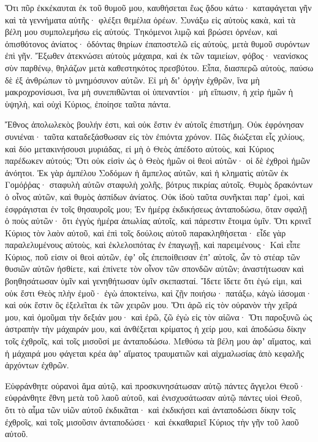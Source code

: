 {Ὅτι πῦρ ἐκκέκαυται ἐκ τοῦ θυμοῦ μου, καυθήσεται ἕως ᾄδου κάτω· καταφάγεται γῆν καὶ τὰ γεννήματα αὐτῆς· φλέξει θεμέλια ὀρέων.
Συνάξω εἰς αὐτοὺς κακὰ, καὶ τὰ βέλη μου συμπολεμήσω εἰς αὐτούς.
Τηκόμενοι λιμῷ καὶ βρώσει ὀρνέων, καὶ ὀπισθότονος ἀνίατος· ὀδόντας θηρίων ἐπαποστελῶ εἰς αὐτοὺς, μετὰ θυμοῦ συρόντων ἐπὶ γῆν.
Ἔξωθεν ἀτεκνώσει αὐτοὺς μάχαιρα, καὶ ἐκ τῶν ταμιείων, φόβος· νεανίσκος σὺν παρθένῳ, θηλάζων μετὰ καθεστηκότος πρεσβύτου.
Εἶπα, διασπερῶ αὐτοὺς, παύσω δὲ ἐξ ἀνθρώπων τὸ μνημόσυνον αὐτῶν.
Εἰ μὴ διʼ ὀργὴν ἐχθρῶν, ἵνα μὴ μακροχρονίσωσι, ἵνα μὴ συνεπιθῶνται οἱ ὑπεναντίοι· μὴ εἴπωσιν, ἡ χεὶρ ἡμῶν ἡ ὑψηλὴ, καὶ οὐχὶ Κύριος, ἐποίησε ταῦτα πάντα.
\par }{\PP {}Ἔθνος ἀπολωλεκὸς βουλήν ἐστι, καὶ οὐκ ἔστιν ἐν αὐτοῖς ἐπιστήμη.
Οὐκ ἐφρόνησαν συνιέναι· ταῦτα καταδεξάσθωσαν εἰς τὸν ἐπιόντα χρόνον.
Πῶς διώξεται εἷς χιλίους, καὶ δύο μετακινήσουσι μυριάδας, εἰ μὴ ὁ Θεὸς ἀπέδοτο αὐτοὺς, καὶ Κύριος παρέδωκεν αὐτούς;
Ὅτι οὐκ εἰσὶν ὡς ὁ Θεὸς ἡμῶν οἱ θεοὶ αὐτῶν· οἱ δὲ ἐχθροὶ ἡμῶν ἀνόητοι.
Ἐκ γὰρ ἀμπέλου Σοδόμων ἡ ἄμπελος αὐτῶν, καὶ ἡ κληματὶς αὐτῶν ἐκ Γομόῤῥας· σταφυλὴ αὐτῶν σταφυλὴ χολῆς, βότρυς πικρίας αὐτοῖς.
Θυμὸς δρακόντων ὁ οἶνος αὐτῶν, καὶ θυμὸς ἀσπίδων ἀνίατος.
Οὐκ ἰδοὺ ταῦτα συνῆκται παρʼ ἐμοὶ, καὶ ἐσφράγισται ἐν τοῖς θησαυροῖς μου;
Ἐν ἡμέρᾳ ἐκδικήσεως ἀνταποδώσω, ὅταν σφαλῇ ὁ ποὺς αὐτῶν· ὅτι ἐγγὺς ἡμέρα ἀπωλίας αὐτοῖς, καὶ πάρεστιν ἕτοιμα ὑμῖν.
Ὅτι κρινεῖ Κύριος τὸν λαὸν αὐτοῦ, καὶ ἐπὶ τοῖς δούλοις αὐτοῦ παρακληθήσεται· εἶδε γὰρ παραλελυμένους αὐτοὺς, καὶ ἐκλελοιπότας ἐν ἐπαγωγῇ, καὶ παρειμένους·
Καὶ εἶπε Κύριος, ποῦ εἰσιν οἱ θεοὶ αὐτῶν, ἐφʼ οἷς ἐπεποίθεισαν ἐπʼ αὐτοῖς,
ὧν τὸ στέαρ τῶν θυσιῶν αὐτῶν ἠσθίετε, καὶ ἐπίνετε τὸν οἶνον τῶν σπονδῶν αὐτῶν; ἀναστήτωσαν καὶ βοηθησάτωσαν ὑμῖν καὶ γενηθήτωσαν ὑμῖν σκεπασταί.
Ἴδετε ἴδετε ὅτι ἐγώ εἰμι, καὶ οὐκ ἔστι Θεὸς πλὴν ἐμοῦ· ἐγὼ ἀποκτείνω, καὶ ζῇν ποιήσω· πατάξω, κἀγὼ ἰάσομαι· καὶ οὐκ ἔστιν ὃς ἐξελεῖται ἐκ τῶν χειρῶν μου.
Ὅτι ἀρῶ εἰς τὸν οὐρανὸν τὴν χεῖρά μου, καὶ ὀμοῦμαι τὴν δεξιάν μου· καὶ ἐρῶ, ζῶ ἐγὼ εἰς τὸν αἰῶνα·
Ὅτι παροξυνῶ ὡς ἀστραπὴν τὴν μάχαιράν μου, καὶ ἀνθέξεται κρίματος ἡ χείρ μου, καὶ ἀποδώσω δίκην τοῖς ἐχθροῖς, καὶ τοῖς μισοῦσί με ἀνταποδώσω.
Μεθύσω τὰ βέλη μου ἀφʼ αἵματος, καὶ ἡ μάχαιρά μου φάγεται κρέα ἀφʼ αἵματος τραυματιῶν καὶ αἰχμαλωσίας ἀπὸ κεφαλῆς ἀρχόντων ἐχθρῶν.
\par }{\PP {}Εὐφράνθητε οὐρανοὶ ἅμα αὐτῷ, καὶ προσκυνησάτωσαν αὐτῷ πάντες ἄγγελοι Θεοῦ· εὐφράνθητε ἔθνη μετὰ τοῦ λαοῦ αὐτοῦ, καὶ ἐνισχυσάτωσαν αὐτῷ πάντες υἱοὶ Θεοῦ, ὅτι τὸ αἷμα τῶν υἱῶν αὐτοῦ ἐκδικᾶται· καὶ ἐκδικήσει καὶ ἀνταποδώσει δίκην τοῖς ἐχθροῖς, καὶ τοῖς μισοῦσιν ἀνταποδώσει· καὶ ἐκκαθαριεῖ Κύριος τὴν γῆν τοῦ λαοῦ αὐτοῦ.
}
